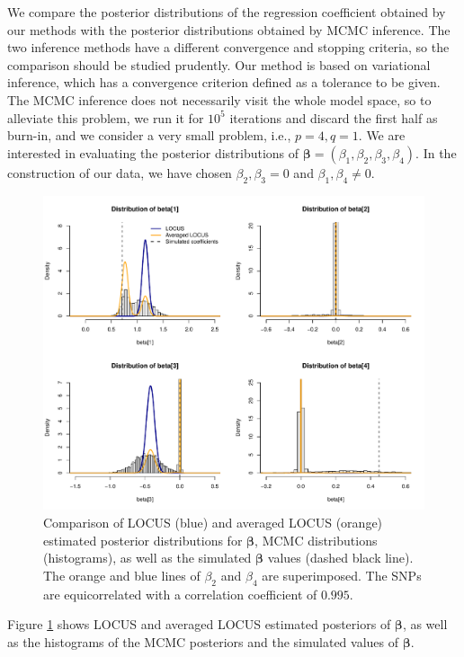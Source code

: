 \documentclass[a4paper, 11pt]{report}
\numberwithin{equation}{chapter}
\begin{document}
We compare the posterior distributions of the regression coefficient obtained by our methods with the posterior distributions obtained by MCMC inference. The two inference methods have a different convergence and stopping criteria, so the comparison should be studied prudently. Our method is based on variational inference, which has a convergence criterion defined as a tolerance to be given. The MCMC inference does not necessarily visit the whole model space, so to alleviate this problem, we run it for $10^5$ iterations and discard the first half as burn-in, and we consider a very small problem, i.e., $p=4, q=1$. We are interested in evaluating the posterior distributions of $\boldsymbol{\beta} = (\beta_1, \beta_2, \beta_3, \beta_4)$. In the construction of our data, we have chosen $\beta_2, \beta_3 = 0$ and $\beta_1, \beta_4 \neq 0$.
\begin{figure}[h]
\centering
\includegraphics[width=\textwidth, bb=0 0 9.8in 8.07in]{images/MCMC_noanneal.pdf}
\caption{\label{fig:no_ann}Comparison of LOCUS (blue) and averaged LOCUS (orange) estimated posterior distributions for $\boldsymbol{\beta}$, MCMC distributions (histograms), as well as the simulated $\boldsymbol{\beta}$ values (dashed black line). The orange and blue lines of $\beta_2$ and $\beta_4$ are superimposed. The SNPs are equicorrelated with a correlation coefficient of $0.995$.}
\end{figure}

Figure \ref{fig:no_ann} shows LOCUS and averaged LOCUS estimated posteriors of $\boldsymbol{\beta}$, as well as the histograms of the MCMC posteriors and the simulated values of $\boldsymbol{\beta}$. 
\end{document}
